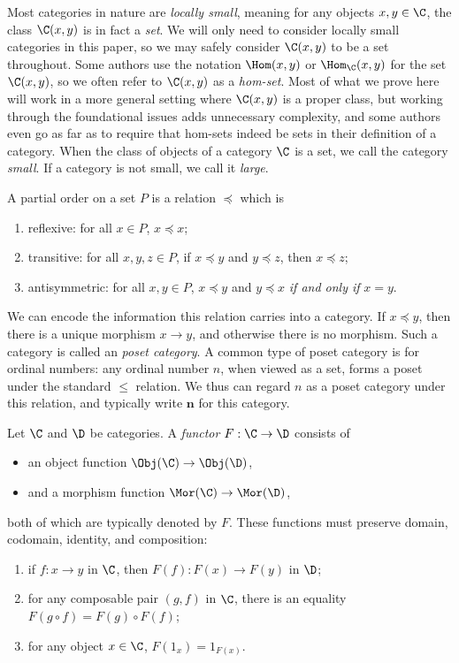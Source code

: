\begin{remark}\label{A.1.3}
    Most categories in nature are \emph{locally small}, meaning for any objects $x,y\in\C$, the class $\C(x,y)$ is in fact a \emph{set}. We will only need to consider locally small categories in this paper, so we may safely consider $\C(x,y)$ to be a set throughout. Some authors use the notation $\Hom(x,y)$ or $\Hom_\C(x,y)$ for the set $\C(x,y)$, so we often refer to $\C(x,y)$ as a \emph{hom-set}. Most of what we prove here will work in a more general setting where $\C(x,y)$ is a proper class, but working through the foundational issues adds unnecessary complexity, and some authors even go as far as to require that hom-sets indeed be sets in their definition of a category. When the class of objects of a category $\C$ is a set, we call the category \emph{small}. If a category is not small, we call it \emph{large}.
\end{remark}

\begin{example}\label{A.1.4}
    A partial order on a set $P$ is a relation $\preceq$ which is
    \begin{enumerate}
        \item reflexive: for all $x\in P$, $x\preceq x$;
        \item transitive: for all $x,y,z\in P$, if $x\preceq y$ and $y\preceq z$, then $x\preceq z$;
        \item antisymmetric: for all $x,y\in P$, $x\preceq y$ and $y\preceq x$ \emph{if and only if} $x=y$.
    \end{enumerate}
    We can encode the information this relation carries into a category. If $x\preceq y$, then there is a unique morphism $x\to y$, and otherwise there is no morphism. Such a category is called an \emph{poset category}. A common type of poset category is for ordinal numbers: any ordinal number $n$, when viewed as a set, forms a poset under the standard $\leq$ relation. We thus can regard $n$ as a poset category under this relation, and typically write $\mathbf{n}$ for this category.
\end{example}

\begin{definition}\label{A.1.5}
    Let $\C$ and $\D$ be categories. A \emph{functor} $F : \C \to \D$ consists of
    \begin{itemize}
        \item an object function $\Obj(\C)\to\Obj(\D)$,
        \item and a morphism function $\Mor(\C)\to\Mor(\D)$,
    \end{itemize}
    both of which are typically denoted by $F$. These functions must preserve domain, codomain, identity, and composition:
    \begin{enumerate}
        \item if $f : x\to y$ in $\C$, then $F(f) : F(x)\to F(y)$ in $\D$;
        \item for any composable pair $(g,f)$ in $\C$, there is an equality $F(g\circ f)=F(g)\circ F(f)$;
        \item for any object $x\in\C$, $F(1_x)=1_{F(x)}$.
    \end{enumerate}
\end{definition}

